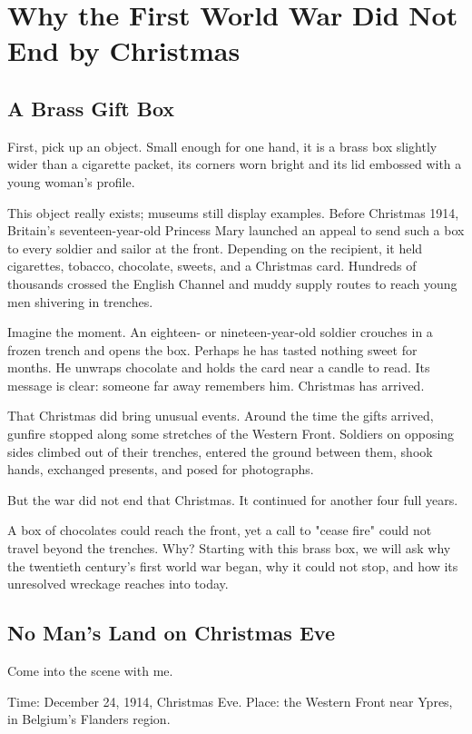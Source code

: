 \chapter[World War I: Not Over by Christmas]{Why the First World War Did Not End by Christmas}
\section{A Brass Gift Box}
First, pick up an object. Small enough for one hand, it is a brass box slightly wider than a cigarette packet, its corners worn bright and its lid embossed with a young woman's profile.

This object really exists; museums still display examples. Before Christmas 1914, Britain's seventeen-year-old Princess Mary launched an appeal to send such a box to every soldier and sailor at the front. Depending on the recipient, it held cigarettes, tobacco, chocolate, sweets, and a Christmas card. Hundreds of thousands crossed the English Channel and muddy supply routes to reach young men shivering in trenches.

Imagine the moment. An eighteen- or nineteen-year-old soldier crouches in a frozen trench and opens the box. Perhaps he has tasted nothing sweet for months. He unwraps chocolate and holds the card near a candle to read. Its message is clear: someone far away remembers him. Christmas has arrived.

That Christmas did bring unusual events. Around the time the gifts arrived, gunfire stopped along some stretches of the Western Front. Soldiers on opposing sides climbed out of their trenches, entered the ground between them, shook hands, exchanged presents, and posed for photographs.

But the war did not end that Christmas. It continued for another four full years.

A box of chocolates could reach the front, yet a call to "cease fire" could not travel beyond the trenches. Why? Starting with this brass box, we will ask why the twentieth century's first world war began, why it could not stop, and how its unresolved wreckage reaches into today.

\section{No Man's Land on Christmas Eve}
Come into the scene with me.

Time: December 24, 1914, Christmas Eve. Place: the Western Front near Ypres, in Belgium's Flanders region.

